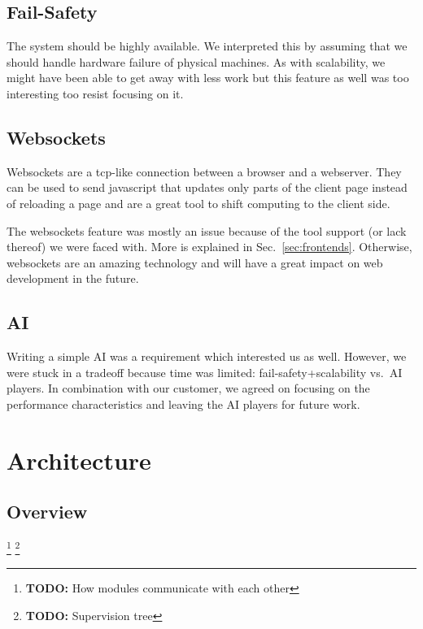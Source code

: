 \documentclass[11pt,a4paper]{report}
\newcommand{\todo}[1]{\footnote{{\color{red} {\bf TODO:} #1}}}
\begin{document}
\subsection{Fail-Safety}
The system should be highly available. We interpreted this by assuming that we
should handle hardware failure of physical machines. As with scalability, we
might have been able to get away with less work but this feature as well was
too interesting too resist focusing on it.

\subsection{Websockets}
Websockets are a tcp-like connection between a browser and a webserver.
They can be used to send javascript that updates only parts of the client page
instead of reloading a page and are a great tool to shift computing to the
client side.

The websockets feature was mostly an issue because of the tool support (or lack
thereof) we were faced with. More is explained in Sec.~\ref{sec:frontends}.
Otherwise, websockets are an amazing technology and will have a great impact on
web development in the future.

\subsection{AI}
Writing a simple AI was a requirement which interested us as well. However, we
were stuck in a tradeoff because time was limited: fail-safety+scalability
vs.\ AI players. In combination with our customer, we agreed on focusing on the
performance characteristics and leaving the AI players for future work.

\section{Architecture}
\subsection{Overview}
\todo{How modules communicate with each other}
\todo{Supervision tree}
\end{document}
